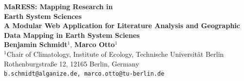 \documentclass[a0,portrait]{a0poster}
\begin{document}
\null  %
\vfill

\begin{center}
	{\VeryHuge\color{tuberlinblue}\textbf{MaRESS: Mapping Research in \\ Earth System Sciences}}\\[1.5cm]
	{\Large\color{darkgray}\textbf{A Modular Web Application for Literature Analysis and Geographic Data Mapping in Earth System Scienes}}\\[0.8cm]

	{\large\color{tuberlinblue}
	\textbf{Benjamin Schmidt}$^1$, \textbf{Marco Otto}$^1$\\[0.3cm]
	$^1$Chair of Climatology, Institute of Ecology, Technische Universität Berlin\\
	Rothenburgstraße 12, 12165 Berlin, Germany\\[0.3cm]
	\texttt{b.schmidt@alganize.de, marco.otto@tu-berlin.de}
	}
\end{center}

\vspace{0.5cm}
\end{document}
